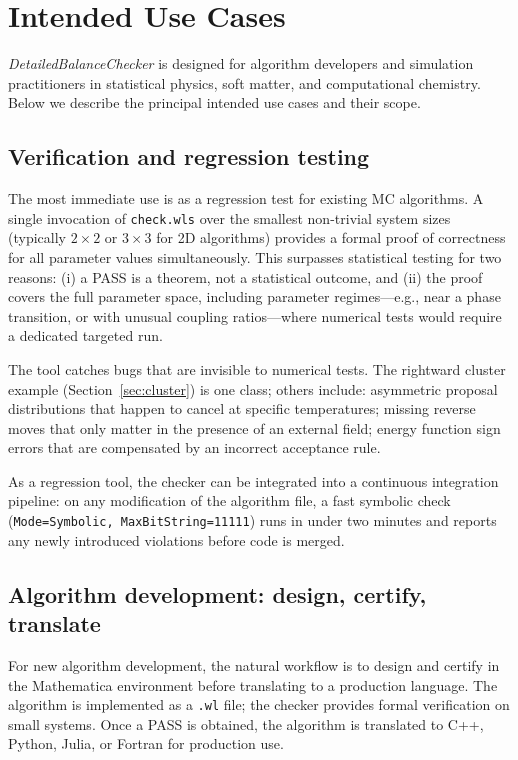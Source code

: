 \documentclass[twocolumn,10pt]{article}
\newcommand{\DBC}{\textit{DetailedBalanceChecker}}
\begin{document}
\section{Intended Use Cases}
\label{sec:usecases}

\DBC{} is designed for algorithm developers and simulation practitioners in
statistical physics, soft matter, and computational chemistry.  Below we
describe the principal intended use cases and their scope.

\subsection{Verification and regression testing}
\label{sec:uc-regression}

The most immediate use is as a regression test for existing MC algorithms.
A single invocation of \texttt{check.wls} over the smallest non-trivial
system sizes (typically $2\times2$ or $3\times3$ for 2D algorithms) provides
a formal proof of correctness for all parameter values simultaneously.  This
surpasses statistical testing for two reasons: (i) a PASS is a theorem, not
a statistical outcome, and (ii) the proof covers the full parameter space,
including parameter regimes---e.g., near a phase transition, or with unusual
coupling ratios---where numerical tests would require a dedicated targeted
run.

The tool catches bugs that are invisible to numerical tests.  The rightward
cluster example (Section~\ref{sec:cluster}) is one class; others include:
asymmetric proposal distributions that happen to cancel at specific
temperatures; missing reverse moves that only matter in the presence of an
external field; energy function sign errors that are compensated by an
incorrect acceptance rule.

As a regression tool, the checker can be integrated into a continuous
integration pipeline: on any modification of the algorithm file, a fast
symbolic check (\texttt{Mode=Symbolic, MaxBitString=11111}) runs in under
two minutes and reports any newly introduced violations before code is merged.

\subsection{Algorithm development: design, certify, translate}
\label{sec:uc-design}

For new algorithm development, the natural workflow is to design and certify
in the Mathematica environment before translating to a production language.
The algorithm is implemented as a \texttt{.wl} file; the checker provides
formal verification on small systems.  Once a PASS is obtained, the algorithm
is translated to C++, Python, Julia, or Fortran for production use.
\end{document}

